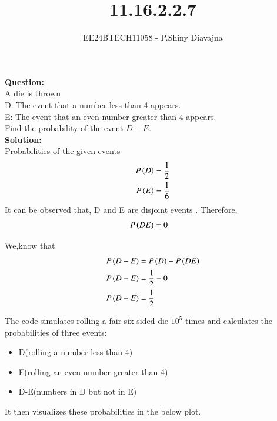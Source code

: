 \documentclass[journal]{IEEEtran}
\begin{document}

\vspace{3cm}

\title{11.16.2.2.7}
\author{EE24BTECH11058 - P.Shiny Diavajna}
{\let\newpage\relax\maketitle}

\renewcommand{\thefigure}{\theenumi}
\renewcommand{\thetable}{\theenumi}
\setlength{\intextsep}{10pt} %


\renewcommand{\thetable}{\theenumi}
\textbf{Question:}\\
A die is thrown\\
D: The event that a number less than 4 appears.\\
E: The event that an even number greater than 4 appears.\\
Find the probability of the event $D-E$.\\


\textbf{Solution:}\\
Probabilities of the given events 
\begin{align}
         P\left(D\right)&=\frac{1}{2}\\
         P\left(E\right)&=\frac{1}{6}\\
\end{align}  
It can be observed that, D and E are disjoint events . Therefore, 
\begin{align}
     P\left(DE\right)&=0
\end{align}

We,know that 
\begin{align}
        P\left(D-E\right)&= P\left(D\right)-P\left(DE\right)\\
        P\left(D-E\right)&= \frac{1}{2} - 0\\
        P\left(D-E\right)&= \frac{1}{2}
\end{align}


The code simulates rolling a fair six-sided die $10^5$ times and calculates the probabilities of three events:
\begin{itemize}
    \item D(rolling a number less than 4)
    \item E(rolling an even number greater than 4)
    \item D-E(numbers in D but not in E)
\end{itemize}
It then visualizes these probabilities in the below plot.         
\end{document}
